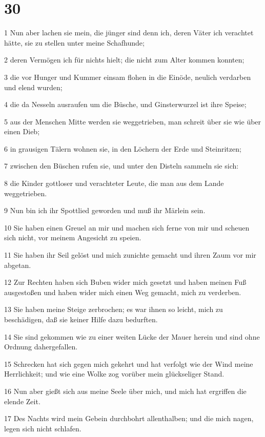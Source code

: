 \chapter{30}

\par 1 Nun aber lachen sie mein, die jünger sind denn ich, deren Väter ich verachtet hätte, sie zu stellen unter meine Schafhunde;
\par 2 deren Vermögen ich für nichts hielt; die nicht zum Alter kommen konnten;
\par 3 die vor Hunger und Kummer einsam flohen in die Einöde, neulich verdarben und elend wurden;
\par 4 die da Nesseln ausraufen um die Büsche, und Ginsterwurzel ist ihre Speise;
\par 5 aus der Menschen Mitte werden sie weggetrieben, man schreit über sie wie über einen Dieb;
\par 6 in grausigen Tälern wohnen sie, in den Löchern der Erde und Steinritzen;
\par 7 zwischen den Büschen rufen sie, und unter den Disteln sammeln sie sich:
\par 8 die Kinder gottloser und verachteter Leute, die man aus dem Lande weggetrieben.
\par 9 Nun bin ich ihr Spottlied geworden und muß ihr Märlein sein.
\par 10 Sie haben einen Greuel an mir und machen sich ferne von mir und scheuen sich nicht, vor meinem Angesicht zu speien.
\par 11 Sie haben ihr Seil gelöst und mich zunichte gemacht und ihren Zaum vor mir abgetan.
\par 12 Zur Rechten haben sich Buben wider mich gesetzt und haben meinen Fuß ausgestoßen und haben wider mich einen Weg gemacht, mich zu verderben.
\par 13 Sie haben meine Steige zerbrochen; es war ihnen so leicht, mich zu beschädigen, daß sie keiner Hilfe dazu bedurften.
\par 14 Sie sind gekommen wie zu einer weiten Lücke der Mauer herein und sind ohne Ordnung dahergefallen.
\par 15 Schrecken hat sich gegen mich gekehrt und hat verfolgt wie der Wind meine Herrlichkeit; und wie eine Wolke zog vorüber mein glückseliger Stand.
\par 16 Nun aber gießt sich aus meine Seele über mich, und mich hat ergriffen die elende Zeit.
\par 17 Des Nachts wird mein Gebein durchbohrt allenthalben; und die mich nagen, legen sich nicht schlafen.
